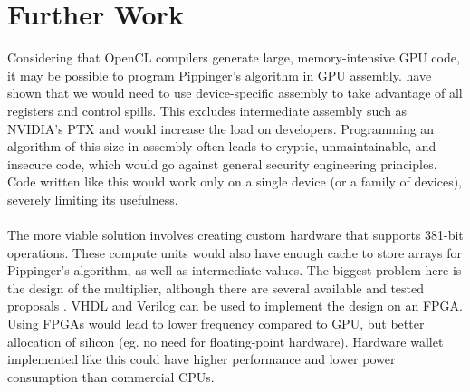 
\chapter{Further Work} %

\label{Chapter8} %


Considering that OpenCL compilers generate large, memory-intensive GPU code, it may be possible to program Pippinger's algorithm in GPU assembly. \cite{bernstein2010ecc2k} have shown that we would need to use device-specific assembly to take advantage of all registers and control spills. This excludes intermediate assembly such as NVIDIA's PTX and would increase the load on developers. Programming an algorithm of this size in assembly often leads to cryptic, unmaintainable, and insecure code, which would go against general security engineering principles. Code written like this would work only on a single device (or a family of devices), severely limiting its usefulness.\\
\\
The more viable solution involves creating custom hardware that supports 381-bit operations. These compute units would also have enough cache to store arrays for Pippinger's algorithm, as well as intermediate values. The biggest problem here is the design of the multiplier, although there are several available and tested proposals \cite{brinci2015efficient, quan2005high}. VHDL and Verilog can be used to implement the design on an FPGA. Using FPGAs would lead to lower frequency compared to GPU, but better allocation of silicon (eg. no need for floating-point hardware). Hardware wallet implemented like this could have higher performance and lower power consumption than commercial CPUs.
